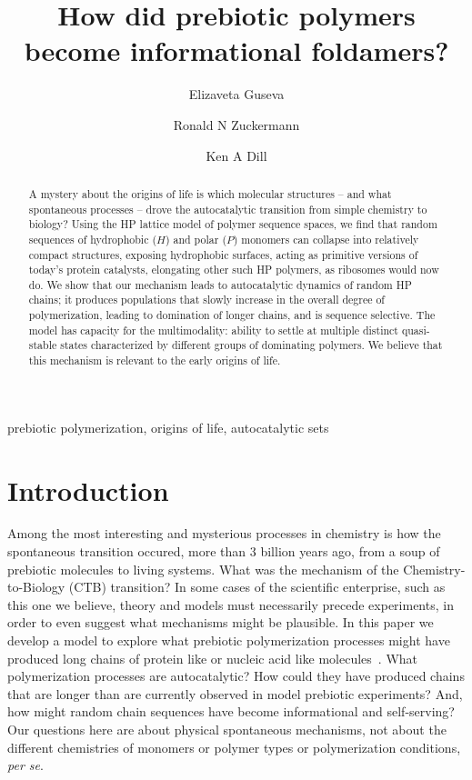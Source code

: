 \documentclass[5p,times]{elsarticle}
\begin{document}
\begin{frontmatter}
\title{How did prebiotic polymers become informational foldamers?}
\author[addr1]{Elizaveta Guseva}
\author[addr2]{Ronald N Zuckermann}
\author[addr1]{Ken A Dill}
\address[addr1]{Laufer Center for Physical and Quantitative Biology, and Departments of Physics \& 
Astronomy and Chemistry, Stony Brook University, Stony Brook, NY, (United States)}
\address[addr2]{Lawrence Berkeley National Laboratory (LBNL), Berkeley, CA (United States)}
% 
\begin{abstract}
A mystery about the origins of life is which molecular structures -- and what spontaneous 
processes -- drove the autocatalytic transition from simple chemistry to biology?  Using the HP 
lattice model of polymer sequence spaces, we find that random sequences of hydrophobic ($H$) and 
polar ($P$) monomers can collapse into relatively compact structures, exposing hydrophobic 
surfaces, acting as primitive versions of today's protein catalysts, elongating other such HP 
polymers, as ribosomes would now do.  We show that our mechanism leads to  autocatalytic 
dynamics of random HP chains; it produces populations that slowly increase in the overall degree 
of polymerization,  leading to domination of longer chains, and is sequence selective. 
The model has capacity for the multimodality: ability to settle at multiple distinct 
quasi-stable states characterized by different groups of dominating polymers.
We believe that this mechanism is relevant to the early origins of life.
\end{abstract}
% 
\begin{keyword}
prebiotic polymerization, origins of life, autocatalytic sets
\end{keyword}
 \end{frontmatter}
\section{Introduction} 

 Among the most interesting and mysterious processes in chemistry is how the spontaneous transition 
occured, more than 3 billion years ago, from a soup of prebiotic molecules to living systems.  What 
was the mechanism of the Chemistry-to-Biology (CTB) transition?  In some cases of the scientific 
enterprise, such as this one we believe, theory and models must necessarily precede experiments, in 
order to even suggest what mechanisms might be plausible.  In this paper we develop a model to 
explore what prebiotic polymerization processes might have produced long chains of protein like or 
nucleic acid like molecules~\cite{Joyce1987,Abel2005}.  What polymerization processes are 
autocatalytic?  How could they have produced chains that are longer than are currently observed in 
model prebiotic experiments?  And, how might random chain sequences have become informational and 
self-serving?  Our questions here are about physical spontaneous mechanisms, not about the 
different chemistries of monomers or polymer types or polymerization conditions, \emph{per se}.  
 
\end{document}

